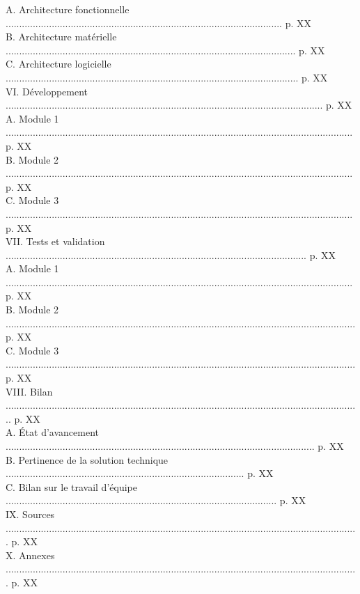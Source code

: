 \documentclass[a4paper,11pt]{book}
\begin{document}
A. Architecture fonctionnelle ...................................................................................................... p. XX\\
B. Architecture matérielle ........................................................................................................... p. XX\\
C. Architecture logicielle ............................................................................................................ p. XX\\
VI. Développement ..................................................................................................................... p. XX\\
A. Module 1 ................................................................................................................................ p. XX\\
B. Module 2 ................................................................................................................................ p. XX\\
C. Module 3 ................................................................................................................................ p. XX\\
VII. Tests et validation ............................................................................................................... p. XX\\
A. Module 1 ................................................................................................................................ p. XX\\
B. Module 2 ................................................................................................................................. p. XX\\
C. Module 3 ................................................................................................................................. p. XX\\
VIII. Bilan ................................................................................................................................... p. XX\\
A. État d'avancement .................................................................................................................. p. XX\\
B. Pertinence de la solution technique ........................................................................................ p. XX\\
C. Bilan sur le travail d'équipe .................................................................................................... p. XX\\
IX. Sources .................................................................................................................................. p. XX\\
X. Annexes .................................................................................................................................. p. XX\\
\end{document}
